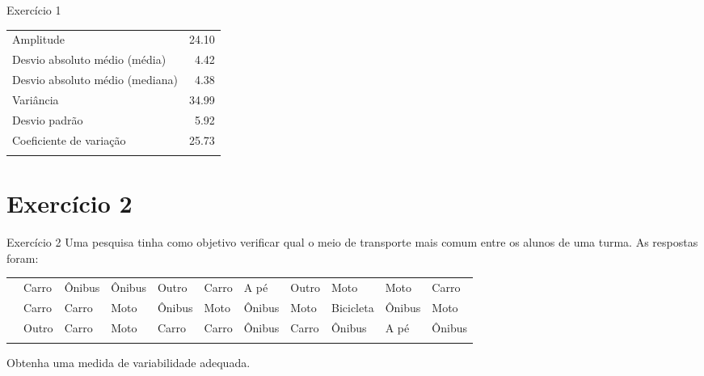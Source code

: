 \documentclass[
  ignorenonframetext,
  serif,
  professionalfont,
  usenames,
  dvipsnames,
  aspectratio = 169]{beamer}
\begin{document}
\begin{frame}{Exercício 1}
\label{exercuxedcio-1-4}
\begin{longtable}[]{@{}lr@{}}
\toprule\noalign{}
\endhead
Amplitude & 24.10 \\
Desvio absoluto médio (média) & 4.42 \\
Desvio absoluto médio (mediana) & 4.38 \\
Variância & 34.99 \\
Desvio padrão & 5.92 \\
Coeficiente de variação & 25.73 \\
\bottomrule\noalign{}
\end{longtable}
\end{frame}

\section{Exercício 2}\label{exercuxedcio-2}

\begin{frame}{Exercício 2}
\label{exercuxedcio-2-1}
Uma pesquisa tinha como objetivo verificar qual o meio de transporte
mais comum entre os alunos de uma turma. As respostas foram:

\begin{longtable}[]{@{}
  >{\raggedright\arraybackslash}p{}
  >{\raggedright\arraybackslash}p{}
  >{\raggedright\arraybackslash}p{}
  >{\raggedright\arraybackslash}p{}
  >{\raggedright\arraybackslash}p{}
  >{\raggedright\arraybackslash}p{}
  >{\raggedright\arraybackslash}p{}
  >{\raggedright\arraybackslash}p{}
  >{\raggedright\arraybackslash}p{}
  >{\raggedright\arraybackslash}p{}
  >{\raggedright\arraybackslash}p{}@{}}
\toprule\noalign{}
\endhead
& Carro & Ônibus & Ônibus & Outro & Carro & A pé & Outro & Moto & Moto &
Carro \\
& Carro & Carro & Moto & Ônibus & Moto & Ônibus & Moto & Bicicleta &
Ônibus & Moto \\
& Outro & Carro & Moto & Carro & Carro & Ônibus & Carro & Ônibus & A pé
& Ônibus \\
\bottomrule\noalign{}
\end{longtable}

Obtenha uma medida de variabilidade adequada.
\end{frame}
\end{document}
